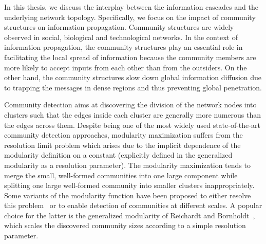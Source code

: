 In this thesis, we discuss the interplay between the information cascades and the underlying network topology. Specifically, we focus on the impact of community structures on information propagation. Community structures are widely observed in social, biological and technological networks. In the context of information propagation, the community structures play an essential role in facilitating the local spread of information because the community members are more likely to accept inputs from each other than from the outsiders. On the other hand, the community structures slow down global information diffusion due to trapping the messages in dense regions and thus preventing global penetration.

Community detection aims at discovering the division of the network nodes into clusters such that the edges inside each cluster are generally more numerous than the edges across them. Despite being one of the most widely used state-of-the-art community detection approaches, modularity maximization suffers from the resolution limit problem which arises due to the implicit dependence of the modularity definition on a constant (explicitly defined in the generalized modularity as a resolution parameter). The modularity maximization tends to merge the small, well-formed communities into one large component while splitting one large well-formed community into smaller clusters inappropriately. Some variants of the modularity function have been proposed to either resolve this problem~\cite{chen2014community,lu2018adaptive} or to enable detection of communities at different scales. A popular choice for the latter is the generalized modularity of Reichardt and Bornholdt~\cite{reichardt2006statistical}, which scales the discovered community sizes according to a simple resolution parameter.

